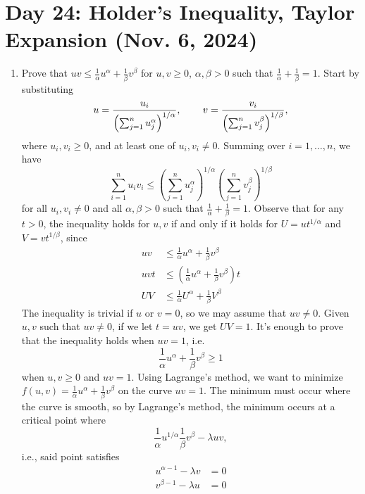 \section{Day 24: Holder's Inequality, Taylor Expansion (Nov. 6, 2024)}
\begin{enumerate}[label=(\alph*)]
    \item Prove that $uv \leq \frac{1}{\alpha}u^\alpha + \frac{1}{\beta} v^\beta$ for $u, v \geq 0$, $\alpha, \beta > 0$ such that $\frac{1}{\alpha} + \frac{1}{\beta} = 1$.
    \medskip\newline
    Start by substituting
    \[ u = \frac{u_i}{\left(\sum_{j=1}^n u_j^\alpha \right)^{1/\alpha}}, \hspace{0.3in} v = \frac{v_i}{\left(\sum_{j=1}^n v_j^\beta \right)^{1/\beta}}, \]
    where $u_i, v_i \geq 0$, and at least one of $u_i, v_i \neq 0$. Summing over $i = 1, \dots, n$, we have
    \[ \sum_{i=1}^n u_iv_i \leq \left(\sum_{j=1}^n u_j^\alpha\right)^{1/\alpha} \left(\sum_{j=1}^n v_j^\beta\right)^{1/\beta} \]
    for all $u_i, v_i \neq 0$ and all $\alpha, \beta > 0$ such that $\frac{1}{\alpha} + \frac{1}{\beta} = 1$. Observe that for any $t > 0$, the inequality holds for $u, v$ if and only if it holds for $U = ut^{1/\alpha}$ and $V = vt^{1/\beta}$, since
    \begin{align*}
        uv &\leq \frac{1}{\alpha} u^\alpha + \frac{1}{\beta} v^\beta \\
        uvt &\leq \left( \frac{1}{\alpha} u^\alpha + \frac{1}{\beta} v^\beta \right) t \\
        UV &\leq \frac{1}{\alpha} U^\alpha + \frac{1}{\beta} V^\beta
    \end{align*}
    The inequality is trivial if $u$ or $v = 0$, so we may assume that $uv \neq 0$. Given $u, v$ such that $uv \neq 0$, if we let $t = uv$, we get $UV = 1$. It's enough to prove that the inequality holds when $uv = 1$, i.e.
    \[ \frac{1}{\alpha} u^\alpha + \frac{1}{\beta} v^\beta \geq 1 \]
    when $u, v \geq 0$ and $uv = 1$. Using Lagrange's method, we want to minimize $f(u, v) = \frac{1}{\alpha} u^\alpha + \frac{1}{\beta} v^\beta$ on the curve $uv = 1$. The minimum must occur where the curve is smooth, so by Lagrange's method, the minimum occurs at a critical point where
    \[ \frac{1}{\alpha} u^{1/\alpha} \frac{1}{\beta} v^\beta - \lambda u v, \]
    i.e., said point satisfies
    \begin{align*}
        u^{\alpha - 1} - \lambda v &= 0 \\
        v^{\beta - 1} - \lambda u &= 0 \\

\end{align*}
\end{enumerate}
